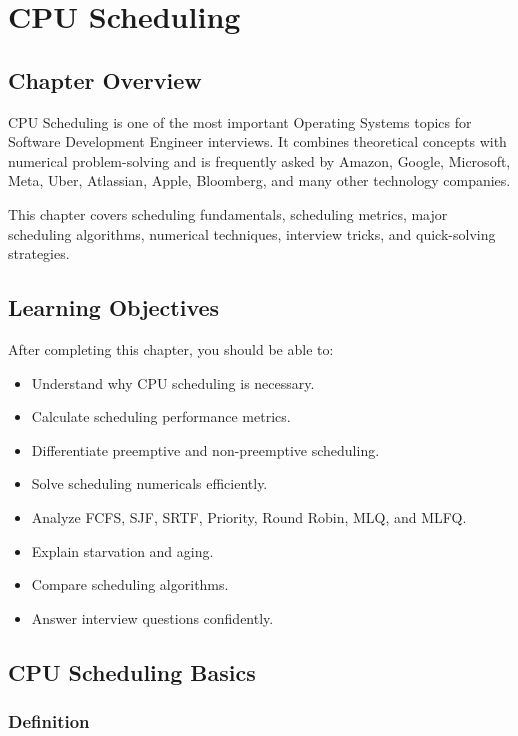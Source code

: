 \chapter{CPU Scheduling}

\section{Chapter Overview}

CPU Scheduling is one of the most important Operating Systems topics for Software Development Engineer interviews. It combines theoretical concepts with numerical problem-solving and is frequently asked by Amazon, Google, Microsoft, Meta, Uber, Atlassian, Apple, Bloomberg, and many other technology companies.

This chapter covers scheduling fundamentals, scheduling metrics, major scheduling algorithms, numerical techniques, interview tricks, and quick-solving strategies.

\section{Learning Objectives}

After completing this chapter, you should be able to:

\begin{itemize}
\item Understand why CPU scheduling is necessary.
\item Calculate scheduling performance metrics.
\item Differentiate preemptive and non-preemptive scheduling.
\item Solve scheduling numericals efficiently.
\item Analyze FCFS, SJF, SRTF, Priority, Round Robin, MLQ, and MLFQ.
\item Explain starvation and aging.
\item Compare scheduling algorithms.
\item Answer interview questions confidently.
\end{itemize}

\section{CPU Scheduling Basics}

\subsection{Definition}

